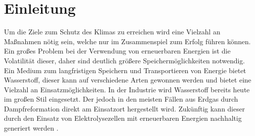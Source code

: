 \chapter{Einleitung}
Um die Ziele zum Schutz des Klimas zu erreichen wird eine Vielzahl an Maßnahmen nötig sein, welche nur im Zusammenspiel zum Erfolg führen können. Ein großes Problem bei der Verwendung von erneuerbaren Energien ist die Volatilität dieser, daher sind deutlich größere Speichermöglichkeiten notwendig. Ein Medium zum langfristigen Speichern und Transportieren von Energie bietet Wasserstoff, dieser kann auf verschiedene Arten gewonnen werden und bietet eine Vielzahl an Einsatzmöglichkeiten. In der Industrie wird Wasserstoff bereits heute im großen Stil eingesetzt. Der jedoch in den meisten Fällen aus Erdgas durch Dampfreformation direkt am Einsatzort hergestellt wird. Zukünftig kann dieser durch den Einsatz von Elektrolysezellen mit erneuerbaren Energien nachhaltig generiert werden \cite{Elektrolyse}. 



